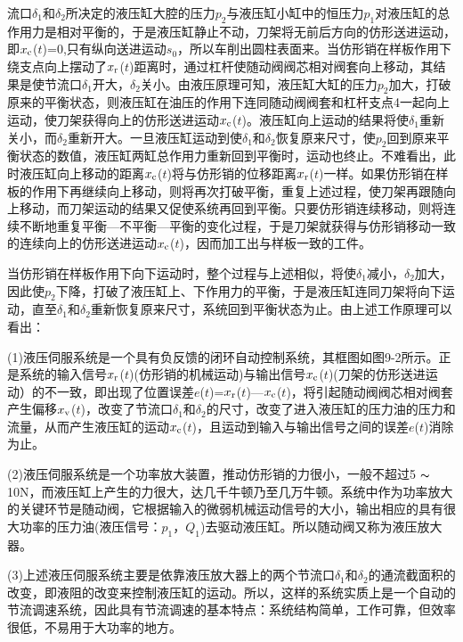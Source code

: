 

    流口$\delta_1$和$\delta_2$所决定的液压缸大腔的压力$p_2$与液压缸小缸中的恒压力$p_1$对液压缸的总作用力是相对平衡的，于是液压缸静止不动，刀架将无前后方向的仿形送进运动，即$x_{\rm c}$($t$)=0,只有纵向送进运动$s_0$，所以车削出圆柱表面来。当仿形销在样板作用下绕支点向上摆动了$x_{\rm r}$($t$)距离时，通过杠杆使随动阀阀芯相对阀套向上移动，其结果是使节流口$\delta_1$开大，$\delta_2$关小。由液压原理可知，液压缸大缸的压力$p_2$加大，打破原来的平衡状态，则液压缸在油压的作用下连同随动阀阀套和杠杆支点4一起向上运动，使刀架获得向上的仿形送进运动$x_{\rm c}$($t$)。液压缸向上运动的结果将使$\delta_1$重新关小，而$\delta_2$重新开大。一旦液压缸运动到使$\delta_1$和$\delta_2$恢复原来尺寸，使$p_2$回到原来平衡状态的数值，液压缸两缸总作用力重新回到平衡时，运动也终止。不难看出，此时液压缸向上移动的距离$x_{\rm c}$($t$)将与仿形销的位移距离$x_{\rm r}$($t$)一样。如果仿形销在样板的作用下再继续向上移动，则将再次打破平衡，重复上述过程，使刀架再跟随向上移动，而刀架运动的结果又促使系统再回到平衡。只要仿形销连续移动，则将连续不断地重复平衡—不平衡—平衡的变化过程，于是刀架就获得与仿形销移动一致的连续向上的仿形送进运动$x_{\rm c}$($t$)，因而加工出与样板一致的工件。

    当仿形销在样板作用下向下运动时，整个过程与上述相似，将使$\delta_1$减小，$\delta_2$加大，因此使$p_2$下降，打破了液压缸上、下作用力的平衡，于是液压缸连同刀架将向下运动，直至$\delta_1$和$\delta_2$重新恢复原来尺寸，系统回到平衡状态为止。由上述工作原理可以看出：

(1)液压伺服系统是一个具有负反馈的闭环自动控制系统，其框图如图9-2所示。正是系统的输入信号$x_{\rm r}$($t$)(仿形销的机械运动)与输出信号$x_{\rm c}$($t$)(刀架的仿形送进运动）的不一致，即出现了位置误差$e$($t$)=$x_{\rm r}$($t$)—$x_{\rm c}$($t$)，将引起随动阀阀芯相对阀套产生偏移$x_{\rm v}$($t$)，改变了节流口$\delta_1$和$\delta_2$的尺寸，改变了进入液压缸的压力油的压力和流量，从而产生液压缸的运动$x_{\rm c}$($t$)，且运动到输入与输出信号之间的误差$e$($t$)消除为止。

(2)液压伺服系统是一个功率放大装置，推动仿形销的力很小，一般不超过5 $\thicksim$ 10N，而液压缸上产生的力很大，达几千牛顿乃至几万牛顿。系统中作为功率放大的关键环节是随动阀，它根据输入的微弱机械运动信号的大小，输出相应的具有很大功率的压力油(液压信号：$p_1$，$Q_1$)去驱动液压缸。所以随动阀又称为液压放大器。

(3)上述液压伺服系统主要是依靠液压放大器上的两个节流口$\delta_1$和$\delta_2$的通流截面积的改变，即液阻的改变来控制液压缸的运动。所以，这样的系统实质上是一个自动的节流调速系统，因此具有节流调速的基本特点：系统结构简单，工作可靠，但效率很低，不易用于大功率的地方。

